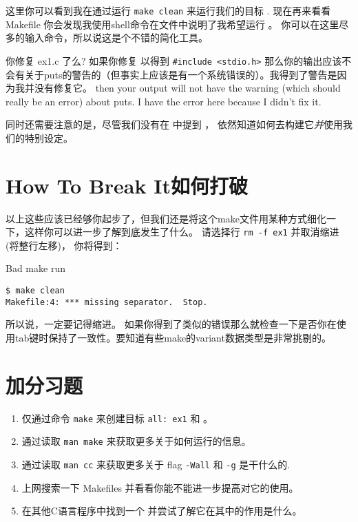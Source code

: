这里你可以看到我在通过运行 \verb|make clean| 来运行我们的目标 .  现在再来看看 Makefile 你会发现我使用shell命令在文件中说明了我希望运行 。 你可以在这里尽多的输入命令，所以说这是个不错的简化工具。 

\begin{aside}{你修复 ex1.c 了么?}
如果你修复  以得到 \verb|#include <stdio.h>| 那么你的输出应该不会有关于puts的警告的（但事实上应该是有一个系统错误的）。我得到了警告是因为我并没有修复它。 then your output will not have the warning (which should really be an error) about puts.  I have the error here because I didn't fix it.
\end{aside}

同时还需要注意的是，尽管我们没有在  中提到  ，  依然知道如何去构建它\emph{并}使用我们的特别设定。


\section{How To Break It如何打破}

以上这些应该已经够你起步了，但我们还是将这个make文件用某种方式细化一下，这样你可以进一步了解到底发生了什么。 请选择行 \verb|rm -f ex1| 并取消缩进 (将整行左移)， 你将得到：

\begin{Terminal}{Bad make run}
\begin{lstlisting}
$ make clean
Makefile:4: *** missing separator.  Stop.
\end{lstlisting}
\end{Terminal}

所以说，一定要记得缩进。
如果你得到了类似的错误那么就检查一下是否你在使用tab键时保持了一致性。要知道有些make的variant数据类型是非常挑剔的。


\section{加分习题}

\begin{enumerate}
\item 仅通过命令 \verb|make| 来创建目标 \verb|all: ex1| 和 。
\item 通过读取 \verb|man make| 来获取更多关于如何运行的信息。
\item 通过读取 \verb|man cc| 来获取更多关于 flag \verb|-Wall| 和 \verb|-g| 是干什么的.
\item 上网搜索一下 Makefiles 并看看你能不能进一步提高对它的使用。
\item 在其他C语言程序中找到一个  并尝试了解它在其中的作用是什么。
\end{enumerate}

